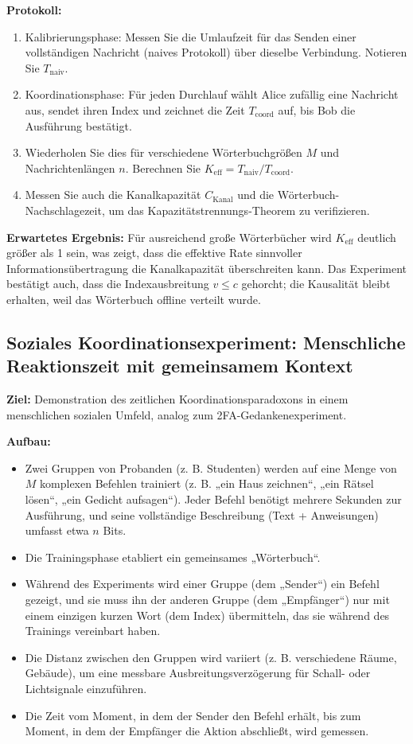 \documentclass[12pt]{article}
\begin{document}
	\textbf{Protokoll:}
	\begin{enumerate}
		\item Kalibrierungsphase: Messen Sie die Umlaufzeit für das Senden einer vollständigen Nachricht (naives Protokoll) über dieselbe Verbindung. Notieren Sie \(T_{\text{naiv}}\).
		\item Koordinationsphase: Für jeden Durchlauf wählt Alice zufällig eine Nachricht aus, sendet ihren Index und zeichnet die Zeit \(T_{\text{coord}}\) auf, bis Bob die Ausführung bestätigt.
		\item Wiederholen Sie dies für verschiedene Wörterbuchgrößen \(M\) und Nachrichtenlängen \(n\). Berechnen Sie \(K_{\mathrm{eff}} = T_{\text{naiv}} / T_{\text{coord}}\).
		\item Messen Sie auch die Kanalkapazität \(C_{\text{Kanal}}\) und die Wörterbuch-Nachschlagezeit, um das Kapazitätstrennungs-Theorem zu verifizieren.
	\end{enumerate}
	
	\textbf{Erwartetes Ergebnis:} Für ausreichend große Wörterbücher wird \(K_{\mathrm{eff}}\) deutlich größer als 1 sein, was zeigt, dass die effektive Rate sinnvoller Informationsübertragung die Kanalkapazität überschreiten kann. Das Experiment bestätigt auch, dass die Indexausbreitung \(v \le c\) gehorcht; die Kausalität bleibt erhalten, weil das Wörterbuch offline verteilt wurde.
	
	\subsection{Soziales Koordinationsexperiment: Menschliche Reaktionszeit mit gemeinsamem Kontext}
	\label{subsec:social-experiment}
	
	\textbf{Ziel:} Demonstration des zeitlichen Koordinationsparadoxons in einem menschlichen sozialen Umfeld, analog zum 2FA-Gedankenexperiment.
	
	\textbf{Aufbau:}
	\begin{itemize}
		\item Zwei Gruppen von Probanden (z. B. Studenten) werden auf eine Menge von \(M\) komplexen Befehlen trainiert (z. B. „ein Haus zeichnen“, „ein Rätsel lösen“, „ein Gedicht aufsagen“). Jeder Befehl benötigt mehrere Sekunden zur Ausführung, und seine vollständige Beschreibung (Text + Anweisungen) umfasst etwa \(n\) Bits.
		\item Die Trainingsphase etabliert ein gemeinsames „Wörterbuch“.
		\item Während des Experiments wird einer Gruppe (dem „Sender“) ein Befehl gezeigt, und sie muss ihn der anderen Gruppe (dem „Empfänger“) nur mit einem einzigen kurzen Wort (dem Index) übermitteln, das sie während des Trainings vereinbart haben.
		\item Die Distanz zwischen den Gruppen wird variiert (z. B. verschiedene Räume, Gebäude), um eine messbare Ausbreitungsverzögerung für Schall- oder Lichtsignale einzuführen.
		\item Die Zeit vom Moment, in dem der Sender den Befehl erhält, bis zum Moment, in dem der Empfänger die Aktion abschließt, wird gemessen.
	\end{itemize}
	
\end{document}
